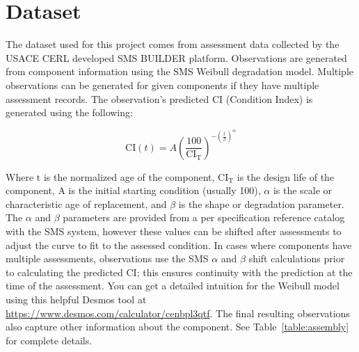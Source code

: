 \documentclass[NewProceedings,letterpaper,NoPageNumbers]{ascelike-new}
\begin{document}
\section{Dataset}

The dataset used for this project comes from assessment data collected by the USACE CERL developed SMS BUILDER platform. Observations are generated from component information using the SMS Weibull degradation model. Multiple observations can be generated for given components if they have multiple assessment records. The observation's predicted CI (Condition Index) is generated using the following:

\begin{equation}
\label{eq:sms-weibull-ci}
\mathrm{CI}(t) = A \left( \frac{100}{\mathrm{CI}_{\mathrm{T}}} \right)^{ -\left(\frac{t}{\beta}\right)^{\alpha} }
\end{equation}

Where $\mathrm{t}$ is the normalized age of the component, $\mathrm{CI_T}$ is the design life of the component, A is the initial starting condition (usually 100), $\alpha$ is the scale or characteristic age of replacement, and $\beta$ is the shape or degradation parameter. The $\alpha$ and $\beta$ parameters are provided from a per specification reference catalog with the SMS system, however these values can be shifted after assessments to adjust the curve to fit to the assessed condition. In cases where components have multiple assessments, observations use the SMS $\alpha$ and $\beta$ shift calculations prior to calculating the predicted CI; this ensures continuity with the prediction at the time of the assessment. You can get a detailed intuition for the Weibull model using this helpful Desmos tool at \url{https://www.desmos.com/calculator/cenbpl3qtf}. The final resulting observations also capture other information about the component. See Table~\ref{table:assembly} for complete details.
\end{document}
